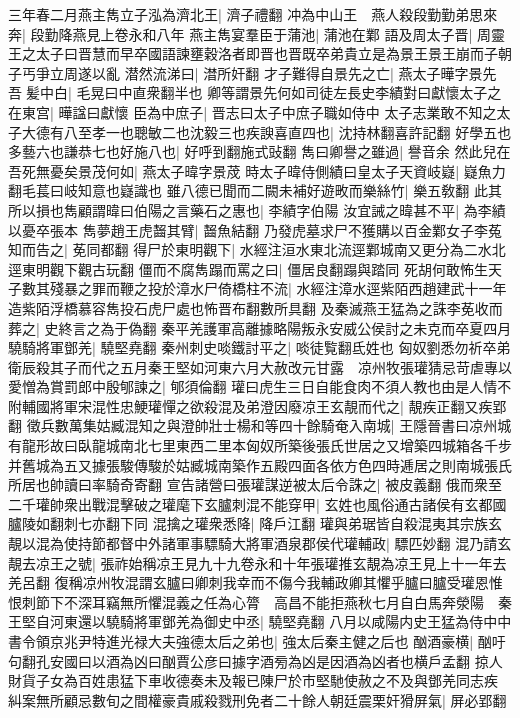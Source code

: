 三年春二月燕主雋立子泓為濟北王|{
	濟子禮翻}
冲為中山王　燕人殺段勤勤弟思來奔|{
	段勤降燕見上卷永和八年}
燕主雋宴羣臣于蒲池|{
	蒲池在鄴}
語及周太子晋|{
	周靈王之太子曰晋慧而早卒國語諫壅穀洛者即晋也晋既卒弟貴立是為景王景王崩而子朝子丐爭立周遂以亂}
潜然流涕曰|{
	澘所奸翻}
才子難得自景先之亡|{
	燕太子曄字景先}
吾髪中白|{
	毛晃曰中直衆翻半也}
卿等謂景先何如司徒左長史李績對曰獻懷太子之在東宫|{
	曄諡曰獻懷}
臣為中庶子|{
	晋志曰太子中庶子職如侍中}
太子志業敢不知之太子大德有八至孝一也聰敏二也沈毅三也疾諛喜直四也|{
	沈持林翻喜許記翻}
好學五也多藝六也謙恭七也好施八也|{
	好呼到翻施式䜴翻}
雋曰卿譽之雖過|{
	譽音余}
然此兒在吾死無憂矣景茂何如|{
	燕太子暐字景荗}
時太子暐侍側績曰皇太子天資岐嶷|{
	嶷魚力翻毛萇曰岐知意也嶷識也}
雖八德已聞而二闕未補好遊畋而樂絲竹|{
	樂五敎翻}
此其所以損也雋顧謂暐曰伯陽之言藥石之惠也|{
	李績字伯陽}
汝宜誡之暐甚不平|{
	為李績以憂卒張本}
雋夢趙王虎齧其臂|{
	齧魚結翻}
乃發虎墓求尸不獲購以百金鄴女子李菟知而告之|{
	莬同都翻}
得尸於東明觀下|{
	水經注洹水東北流逕鄴城南又更分為二水北逕東明觀下觀古玩翻}
僵而不腐雋蹋而罵之曰|{
	僵居良翻蹋與踏同}
死胡何敢怖生天子數其殘暴之罪而鞭之投於漳水尸倚橋柱不流|{
	水經注漳水逕紫陌西趙建武十一年造紫陌浮橋慕容雋投石虎尸處也怖晋布翻數所具翻}
及秦滅燕王猛為之誅李莬收而葬之|{
	史終言之為于偽翻}
秦平羌護軍高離據略陽叛永安威公侯討之未克而卒夏四月驍騎將軍鄧羌|{
	驍堅堯翻}
秦州刺史啖鐵討平之|{
	啖徒覧翻氐姓也}
匈奴劉悉勿祈卒弟衛辰殺其子而代之五月秦王堅如河東六月大赦改元甘露　凉州牧張瓘猜忌苛虐專以愛憎為賞罰郎中殷郇諫之|{
	郇須倫翻}
瓘曰虎生三日自能食肉不須人教也由是人情不附輔國將軍宋混性忠鯁瓘憚之欲殺混及弟澄因廢凉王玄靚而代之|{
	靚疾正翻又疾郢翻}
徵兵數萬集姑臧混知之與澄帥壯士楊和等四十餘騎奄入南城|{
	王隱晉書曰凉州城有龍形故曰臥龍城南北七里東西二里本匈奴所築後張氏世居之又增築四城箱各千步并舊城為五又據張駿傳駿於姑臧城南築作五殿四面各依方色四時逓居之則南城張氏所居也帥讀曰率騎奇寄翻}
宣告諸營曰張瓘謀逆被太后令誅之|{
	被皮義翻}
俄而衆至二千瓘帥衆出戰混擊破之瓘麾下玄臚刺混不能穿甲|{
	玄姓也風俗通古諸侯有玄都國臚陵如翻刺七亦翻下同}
混擒之瓘衆悉降|{
	降戶江翻}
瓘與弟琚皆自殺混夷其宗族玄靚以混為使持節都督中外諸軍事驃騎大將軍酒泉郡侯代瓘輔政|{
	驃匹妙翻}
混乃請玄靚去凉王之號|{
	張祚始稱凉王見九十九卷永和十年張瓘推玄靚為凉王見上十一年去羌呂翻}
復稱凉州牧混謂玄臚曰卿刺我幸而不傷今我輔政卿其懼乎臚曰臚受瓘恩惟恨刺節下不深耳竊無所懼混義之任為心膂　高昌不能拒燕秋七月自白馬奔滎陽　秦王堅自河東還以驍騎將軍鄧羌為御史中丞|{
	驍堅堯翻}
八月以咸陽内史王猛為侍中中書令領京兆尹特進光禄大夫強德太后之弟也|{
	強太后秦主健之后也}
酗酒豪横|{
	酗吁句翻孔安國曰以酒為凶曰酗賈公彦曰據字酒㫄為凶是因酒為凶者也横戶孟翻}
掠人財貨子女為百姓患猛下車收德奏未及報已陳尸於市堅馳使赦之不及與鄧羌同志疾糾案無所顧忌數旬之間權豪貴戚殺戮刑免者二十餘人朝廷震栗奸猾屏氣|{
	屏必郢翻}
